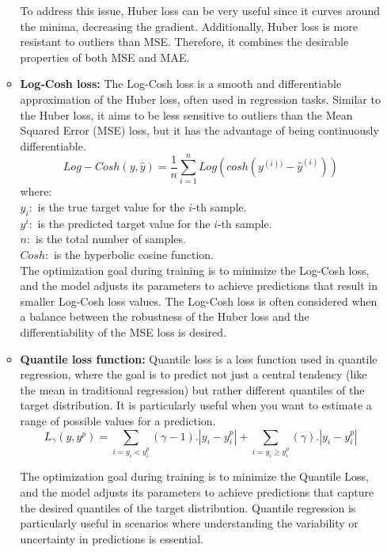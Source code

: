 \begin{itemize}
\begin{itemize}
    To address this issue, Huber loss can be very useful since it curves around the minima, decreasing the gradient. Additionally, Huber loss is more resistant to outliers than MSE. Therefore, it combines the desirable properties of both MSE and MAE.
    \item  \textbf{Log-Cosh loss: } The Log-Cosh loss is a smooth and differentiable approximation of the Huber loss, often used in regression tasks. Similar to the Huber loss, it aims to be less sensitive to outliers than the Mean Squared Error (MSE) loss, but it has the advantage of being continuously differentiable.
     $$Log-Cosh(y,\hat{y})=\frac{1}{n}\sum_{i=1}^{n}Log(cosh(y^{(i))}-\hat{y}^{(i)}))$$
     where: \\
      $y_{i}: $ is the true target value for the \(i\)-th sample.\\
      $y^{i}: $ is the predicted target value for the \(i\)-th sample.\\
      $n: $ is the total number of samples.\\
      \(Cosh: \) is the hyperbolic cosine function.\\
      The optimization goal during training is to minimize the Log-Cosh loss, and the model adjusts its parameters to achieve predictions that result in smaller Log-Cosh loss values. The Log-Cosh loss is often considered when a balance between the robustness of the Huber loss and the differentiability of the MSE loss is desired.
      \item \textbf{Quantile loss function: } Quantile loss is a loss function used in quantile regression, where the goal is to predict not just a central tendency (like the mean in traditional regression) but rather different quantiles of the target distribution. It is particularly useful when you want to estimate a range of possible values for a prediction.
      $$L_{\gamma}(y, y^{p})=\sum_{i=y_{i}<y_{i}^{p}}(\gamma-1).|y_{i}-{y_{i}^{p}}|+ \sum_{i=y_{i}\geq y_{i}^{p}}(\gamma).|y_{i}-y_{i}^{p}|$$

      The optimization goal during training is to minimize the Quantile Loss, and the model adjusts its parameters to achieve predictions that capture the desired quantiles of the target distribution. Quantile regression is particularly useful in scenarios where understanding the variability or uncertainty in predictions is essential.
      
    
     

\end{itemize}
\end{itemize}
